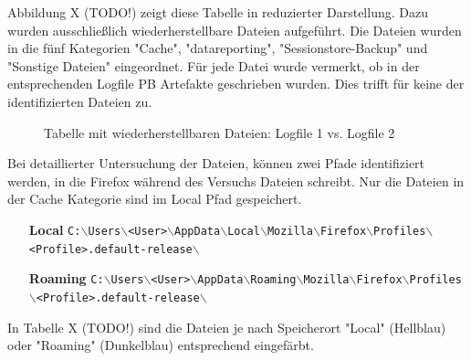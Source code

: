 Abbildung X (TODO!) zeigt diese Tabelle in reduzierter Darstellung.
Dazu wurden ausschließlich wiederherstellbare Dateien aufgeführt. 
Die Dateien wurden in die fünf Kategorien "Cache", "datareporting", "Sessionstore-Backup" und "Sonstige Dateien" eingeordnet.
Für jede Datei wurde vermerkt, ob in der entsprechenden Logfile PB Artefakte geschrieben wurden.
Dies trifft für keine der identifizierten Dateien zu.
\begin{figure}[h!]
	\caption{Tabelle mit wiederherstellbaren Dateien: Logfile 1 vs. Logfile 2}
\end{figure}

Bei detaillierter Untersuchung der Dateien, können zwei Pfade identifiziert werden, in die Firefox während des Versuchs Dateien schreibt. Nur die Dateien in der Cache Kategorie sind im Local Pfad gespeichert.
\begin{itemize}
\item[\textbf{Local}] \texttt{C:$\backslash$Users$\backslash$<User>$\backslash$AppData$\backslash$Local$\backslash$Mozilla$\backslash$Firefox$\backslash$Profiles$\backslash$<Profile>.default-release$\backslash$}
\item[\textbf{Roaming}] \texttt{C:$\backslash$Users$\backslash$<User>$\backslash$AppData$\backslash$Roaming$\backslash$Mozilla$\backslash$Firefox$\backslash$Profiles$\backslash$<Profile>.default-release$\backslash$}
\end{itemize}
In Tabelle X (TODO!) sind die Dateien je nach Speicherort "Local" (Hellblau) oder "Roaming" (Dunkelblau) entsprechend eingefärbt. 

